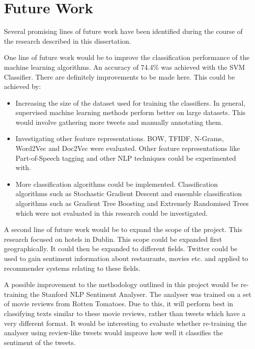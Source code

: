 \section{Future Work}

Several promising lines of future work have been identified during the course of the research described in this dissertation.

One line of future work would be to improve the classification performance of the machine learning algorithms. An accuracy of 74.4\% was achieved with the SVM Classifier. There are definitely improvements to be made here. This could be achieved by:
\begin{itemize}
    \item Increasing the size of the dataset used for training the classifiers. In general, supervised machine learning methods perform better on large datasets. This would involve gathering more tweets and manually annotating them.
    \item Investigating other feature representations. BOW, TFIDF, N-Grams, Word2Vec and Doc2Vec were evaluated. Other feature representations like Part-of-Speech tagging and other NLP techniques could be experimented with.
    \item More classification algorithms could be implemented. Classification algorithms such as Stochastic Gradient Descent and ensemble classification algorithms such as Gradient Tree Boosting and Extremely Randomised Trees which were not evaluated in this research could be investigated. 
\end{itemize}

A second line of future work would be to expand the scope of the project. This research focused on hotels in Dublin. This scope could be expanded first geographically. It could then be expanded to different fields. Twitter could be used to gain sentiment information about restaurants, movies etc. and applied to recommender systems relating to these fields.

A possible improvement to the methodology outlined in this project would be re-training the Stanford NLP Sentiment Analyser. The analyser was trained on a set of movie reviews from Rotten Tomatoes. Due to this, it will perform best in classifying texts similar to these movie reviews, rather than tweets which have a very different format. It would be interesting to evaluate whether re-training the analyser using review-like tweets would improve how well it classifies the sentiment of the tweets. 

